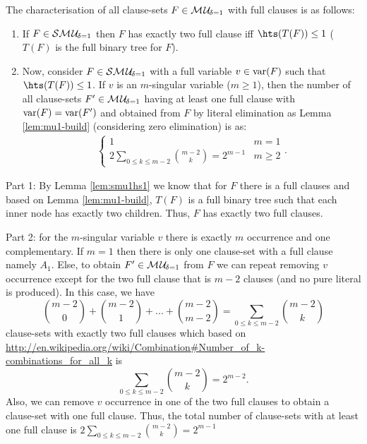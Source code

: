 \documentclass{article}
\begin{document}
 
                                                                           
\begin{lem}\label{lem:comb-mu1}
The characterisation of all clause-sets $F \in \mathcal{M\hspace{0.8pt}U}_{\!\delta=1}$ with full clauses is as follows:
  \begin{enumerate}
  \item If $F\in \mathcal{S}\mathcal{M\hspace{0.8pt}U}_{\!\delta=1} $ then $F$ has exactly two full clause iff $\hts(T(F)) \le 1$ ($T(F)$ is the full binary tree for $F$). 
  \item Now, consider $F \in \mathcal{S}\mathcal{M\hspace{0.8pt}U}_{\!\delta=1}$ with a full variable $v \in \operatorname{var}(F)$ such that $\hts(T(F)) \le 1$. If $v$ is an $m$-singular variable ($m \ge 1$), then the number of all clause-sets $F' \in \mathcal{M\hspace{0.8pt}U}_{\!\delta=1}$ having at least one full clause with $\operatorname{var}(F)=\operatorname{var}(F')$ and obtained from $F$ by literal elimination as Lemma \ref{lem:mu1-build} (considering zero elimination) is as:
    \begin{eqnarray*}
  \begin{cases}
 1  & m=1\\ 2 \sum_{0 \le k \le m-2} {m-2 \choose k}=2^{m-1}  & m \ge 2
  \end{cases}.
  \end{eqnarray*}  
  \end{enumerate}                       
\end{lem}  
\begin{prf}
Part 1: By Lemma \ref{lem:smu1hs1} we know that for $F$ there is a full clauses and based on Lemma \ref{lem:mu1-build}, $T(F)$ is a full binary tree such that each inner node has exactly two children. Thus, $F$ has exactly two full clauses.

Part 2: for the $m$-singular variable $v$ there is exactly $m$ occurrence and one complementary. If $m=1$ then there is only one clause-set with a full clause namely $A_1$. Else, to obtain $F' \in \mathcal{M\hspace{0.8pt}U}_{\!\delta=1}$ from $F$ we can repeat removing $v$ occurrence except for the two full clause that is $m-2$ clauses (and no pure literal is produced). In this case, we have
\begin{displaymath}
{m-2 \choose 0}+{m-2 \choose 1}+...+{m-2 \choose m-2}= \sum_{0 \le k \le m-2} {m-2 \choose k} 
\end{displaymath} 
clause-sets with exactly two full clauses which based on \url{http://en.wikipedia.org/wiki/Combination#Number_of_k-combinations_for_all_k} is
\begin{displaymath}
\sum_{0 \le k \le m-2} {m-2 \choose k}=2^{m-2}.
\end{displaymath}  
Also, we can remove $v$ occurrence in one of the two full clauses to obtain a clause-set with one full clause. Thus, the total number of clause-sets with at least one full clause is $2 \sum_{0 \le k \le m-2} {m-2 \choose k}=2^{m-1}$ 
\end{prf}  
\end{document}
